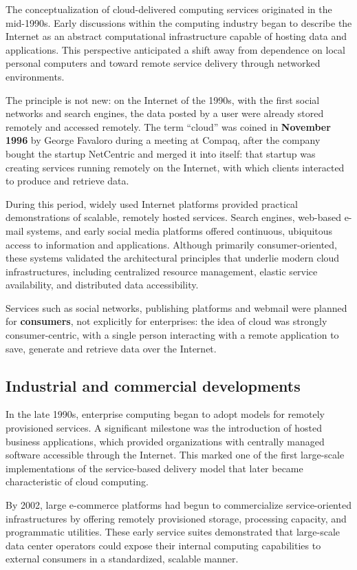 The conceptualization of cloud-delivered computing services originated in the mid-1990s. Early discussions within the computing industry began to describe the Internet as an abstract computational infrastructure capable of hosting data and applications. This perspective anticipated a shift away from dependence on local personal computers and toward remote service delivery through networked environments.

The principle is not new: on the Internet of the 1990s, with the first social networks and search engines, the data posted by a user were already stored remotely and accessed remotely. The term ``cloud'' was coined in \textbf{November 1996} by George Favaloro during a meeting at Compaq, after the company bought the startup NetCentric and merged it into itself: that startup was creating services running remotely on the Internet, with which clients interacted to produce and retrieve data.

During this period, widely used Internet platforms provided practical demonstrations of scalable, remotely hosted services. Search engines, web-based e-mail systems, and early social media platforms offered continuous, ubiquitous access to information and applications. Although primarily consumer-oriented, these systems validated the architectural principles that underlie modern cloud infrastructures, including centralized resource management, elastic service availability, and distributed data accessibility.

Services such as social networks, publishing platforms and webmail were planned for \textbf{consumers}, not explicitly for enterprises: the idea of cloud was strongly consumer-centric, with a single person interacting with a remote application to save, generate and retrieve data over the Internet.

\subsection{Industrial and commercial developments}

In the late 1990s, enterprise computing began to adopt models for remotely provisioned services. A significant milestone was the introduction of hosted business applications, which provided organizations with centrally managed software accessible through the Internet. This marked one of the first large-scale implementations of the service-based delivery model that later became characteristic of cloud computing.

By 2002, large e-commerce platforms had begun to commercialize service-oriented infrastructures by offering remotely provisioned storage, processing capacity, and programmatic utilities. These early service suites demonstrated that large-scale data center operators could expose their internal computing capabilities to external consumers in a standardized, scalable manner.

